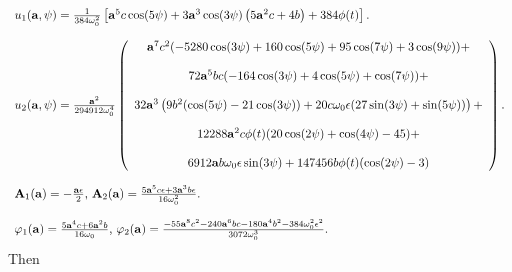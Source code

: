 \documentclass{ws-ijbc}
\begin{document}
\begin{equation}
\begin{array}{l}
u_{1}(\mathbf{a},\psi )=\frac{1}{384\omega _{0}^{2}}\left[ \mathbf{a}%
^{5}c\cos (5\psi )+3\mathbf{a}^{3}\cos (3\psi )\left( 5\mathbf{a}%
^{2}c+4b\right) +384\phi (t)\right] . \\ 
\\ 
u_{2}(\mathbf{a},\psi )=\frac{\mathbf{a}^{2}}{294912\omega _{0}^{4}}\left( 
\begin{array}{c}
\mathbf{a}^{7}c^{2}(-5280\cos (3\psi )+160\cos (5\psi )+95\cos (7\psi
)+3\cos (9\psi ))+ \\ 
\\ 
72\mathbf{a}^{5}bc(-164\cos (3\psi )+4\cos (5\psi )+\cos (7\psi ))+ \\ 
\\ 
32\mathbf{a}^{3}\left( 9b^{2}(\cos (5\psi )-21\cos (3\psi ))+20c\omega
_{0}\epsilon (27\sin (3\psi )+\sin (5\psi ))\right) + \\ 
\\ 
12288\mathbf{a}^{2}c\phi (t)(20\cos (2\psi )+\cos (4\psi )-45)+ \\ 
\\ 
6912\mathbf{a}b\omega _{0}\epsilon \sin (3\psi )+147456b\phi (t)(\cos (2\psi
)-3)%
\end{array}%
\right) . \\ 
\\ 
\mathbf{A}_{1}(\mathbf{a})=-\frac{\mathbf{a}\epsilon }{2}\text{, }\mathbf{A}%
_{2}(\mathbf{a})=\frac{5\mathbf{a}^{5}c\epsilon +3\mathbf{a}^{3}b\epsilon }{%
16\omega _{0}^{2}}. \\ 
\\ 
\varphi _{1}(\mathbf{a})=\frac{5\mathbf{a}^{4}c+6\mathbf{a}^{2}b}{16\omega
_{0}}\text{, }\varphi _{2}(\mathbf{a})=\frac{-55\mathbf{a}^{8}c^{2}-240%
\mathbf{a}^{6}bc-180\mathbf{a}^{4}b^{2}-384\omega _{0}^{2}\epsilon ^{2}}{%
3072\omega _{0}^{3}}.%
\end{array}
\label{k5}
\end{equation}%
Then 
\end{document}
